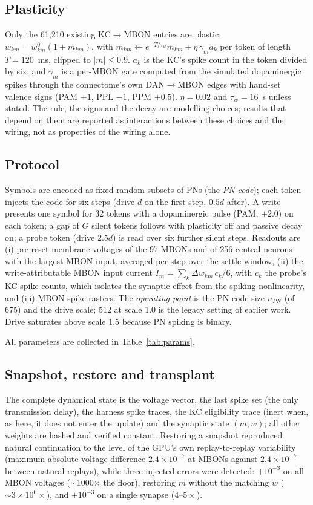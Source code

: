 \documentclass[conference]{IEEEtran}
\begin{document}
\subsection{Plasticity}
Only the 61{,}210 existing KC$\rightarrow$MBON entries are plastic:
$w_{km}=w^0_{km}(1+m_{km})$, with
$m_{km}\leftarrow e^{-T/\tau_w}m_{km}+\eta\,\gamma_m a_k$ per token of length
$T=120$~ms, clipped to $|m|\le0.9$. $a_k$ is the KC's spike count in the token
divided by six, and $\gamma_m$ is a per-MBON gate computed from the simulated
dopaminergic spikes through the connectome's own DAN$\rightarrow$MBON edges with
hand-set valence signs (PAM $+1$, PPL $-1$, PPM $+0.5$). $\eta=0.02$ and
$\tau_w=16$~s unless stated. The rule, the signs and the decay are modelling
choices; results that depend on them are reported as interactions between
these choices and the wiring, not as properties of the wiring alone.

\subsection{Protocol}
Symbols are encoded as fixed random subsets of PNs (the \emph{PN code}); each
token injects the code for six steps (drive $d$ on the first step, $0.5d$
after). A write presents one symbol for 32 tokens with a dopaminergic pulse
(PAM, $+2.0$) on each token; a gap of $G$ silent tokens follows with plasticity
off and passive decay on; a probe token (drive $2.5d$) is read over six further
silent steps. Readouts are (i) pre-reset membrane voltages of the 97 MBONs and
of 256 central neurons with the largest MBON input, averaged per step over the
settle window, (ii) the write-attributable MBON input current
$I_m=\sum_k\Delta w_{km}\,c_k/6$, with $c_k$ the probe's KC spike counts, which
isolates the synaptic effect from the spiking nonlinearity, and (iii) MBON
spike rasters. The \emph{operating point} is the PN code size $n_{PN}$ (of 675)
and the drive scale; 512 at scale 1.0 is the legacy setting of earlier work.
Drive saturates above scale 1.5 because PN spiking is binary.

All parameters are collected in Table~\ref{tab:params}.

\subsection{Snapshot, restore and transplant}
The complete dynamical state is the voltage vector, the last spike set (the
only transmission delay), the harness spike traces, the KC eligibility trace
(inert when, as here, it does not enter the update) and the synaptic state
$(m,w)$; all other weights are hashed and verified constant. Restoring a
snapshot reproduced natural continuation to the level of the GPU's own
replay-to-replay variability (maximum absolute voltage difference
$2.4\times10^{-7}$ at MBONs against $2.4\times10^{-7}$ between natural replays),
while three injected errors were detected: $+10^{-3}$ on all MBON voltages
($\sim$1000$\times$ the floor), restoring $m$ without the matching $w$
($\sim3\times10^6\times$), and $+10^{-3}$ on a single synapse ($4$--$5\times$).
\end{document}
